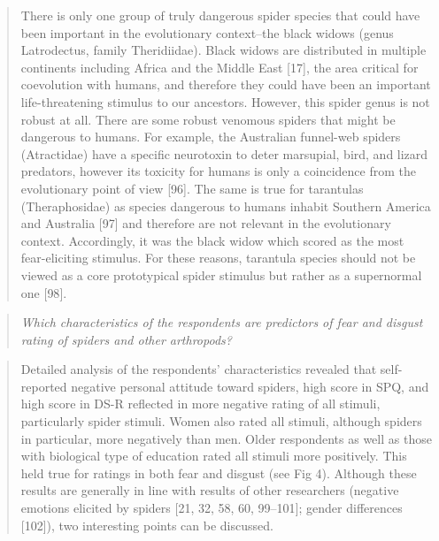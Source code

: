 \documentclass[
]{book}
\begin{document}
\begin{quote}
There is only one group of truly dangerous spider species that could have been important in the evolutionary context--the black widows (genus Latrodectus, family Theridiidae). Black widows are distributed in multiple continents including Africa and the Middle East {[}17{]}, the area critical for coevolution with humans, and therefore they could have been an important life-threatening stimulus to our ancestors. However, this spider genus is not robust at all. There are some robust venomous spiders that might be dangerous to humans. For example, the Australian funnel-web spiders (Atractidae) have a specific neurotoxin to deter marsupial, bird, and lizard predators, however its toxicity for humans is only a coincidence from the evolutionary point of view {[}96{]}. The same is true for tarantulas (Theraphosidae) as species dangerous to humans inhabit Southern America and Australia {[}97{]} and therefore are not relevant in the evolutionary context. Accordingly, it was the black widow which scored as the most fear-eliciting stimulus. For these reasons, tarantula species should not be viewed as a core prototypical spider stimulus but rather as a supernormal one {[}98{]}.
\end{quote}

\begin{quote}
\emph{Which characteristics of the respondents are predictors of fear and disgust rating of spiders and other arthropods?}
\end{quote}

\begin{quote}
Detailed analysis of the respondents' characteristics revealed that self-reported negative personal attitude toward spiders, high score in SPQ, and high score in DS-R reflected in more negative rating of all stimuli, particularly spider stimuli. Women also rated all stimuli, although spiders in particular, more negatively than men. Older respondents as well as those with biological type of education rated all stimuli more positively. This held true for ratings in both fear and disgust (see Fig 4). Although these results are generally in line with results of other researchers (negative emotions elicited by spiders {[}21, 32, 58, 60, 99--101{]}; gender differences {[}102{]}), two interesting points can be discussed.
\end{quote}
\end{document}
